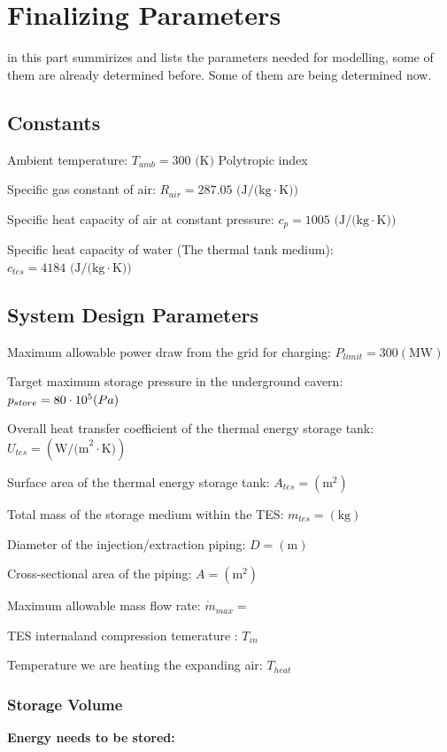 \section{Finalizing Parameters}
 in this part summirizes and lists the parameters needed for modelling, some of them are already determined before. Some of them are being determined now.

 \vspace{1em}

\subsection{Constants}
Ambient temperature: $T_{amb}= 300 \text{ (K)}$  
Polytropic index 

Specific gas constant of air: $R_{air}= 287.05 \text{ (J/(kg} \cdot \text{K)})$

 Specific heat capacity of air at constant pressure: $c_p= 1005 \text{ (J/(kg} \cdot \text{K)})$ 

Specific heat capacity of water (The thermal tank medium): $c_{tes}= 4184 \text{ (J/(kg} \cdot \text{K)})$

\subsection{ System Design Parameters}
Maximum allowable power draw from the grid for charging: $P_{limit}=300(\text{MW})$

Target maximum storage pressure in the underground cavern: $p_{store}=80\cdot10^5\text({Pa})$

Overall heat transfer coefficient of the thermal energy storage tank: $U_{tes}=(\text{W/(m}^2 \cdot \text{K)})$

Surface area of the thermal energy storage tank: $A_{tes}=(\text{m}^2)$

Total mass of the storage medium within the TES: $m_{tes}=(\text{kg})$

Diameter of the injection/extraction piping: $D=(\text{m})$

Cross-sectional area of the piping: $A=(\text{m}^2)$

Maximum allowable mass flow rate: $\dot{m}_{max}=$

TES internaland compression temerature : $T_{in}$

Temperature we are heating the expanding air: $T_{heat}$

\subsubsection{Storage Volume}
\textbf{Energy needs to be stored:}

